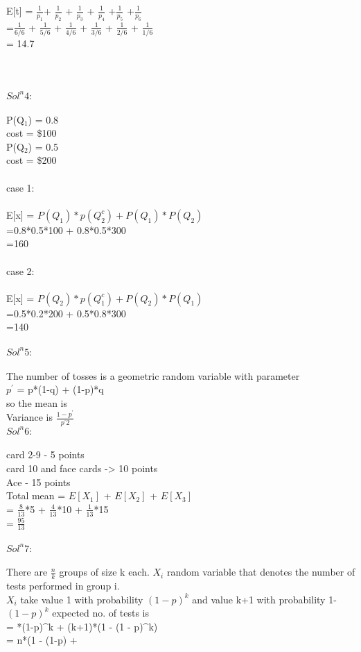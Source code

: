\documentclass{article}
\begin{document}
E[t] = $\frac{1}{p_1}$+ $\frac{1}{p_2}$ + $\frac{1}{p_3}$ + $\frac{1}{p_4}$ +$\frac{1}{p_5}$ +$\frac{1}{p_6}$  \\
        =$\frac{1}{6/6}$ + $\frac{1}{5/6}$ + $\frac{1}{4/6}$ + $\frac{1}{3/6}$ + $\frac{1}{2/6}$ + $\frac{1}{1/6}$ \\
= 14.7\\\\\\\\
\textbf{$Sol^n 4:$} \\\\
P(Q$_1$) = 0.8 \\
cost = \$100 \\
P(Q$_2$) = 0.5 \\
cost = \$200 \\\\
case 1:\\\\
E[x] = $P(Q_1)*p(Q_2^c) + P(Q_1)*P(Q_2)$\\
=0.8*0.5*100 + 0.8*0.5*300\\
=160\\\\
case 2:\\\\
E[x] = $P(Q_2)*p(Q_1^c) + P(Q_2)*P(Q_1)$\\
=0.5*0.2*200 + 0.5*0.8*300\\
=140\\\\
\textbf{$Sol^n 5:$} \\\\
The number of tosses is a geometric random variable with parameter \\
$p^{'}$ = p*(1-q) + (1-p)*q \\
so the mean is \\
Variance is $\frac{1-p^'}{p^'2}$\\
\textbf{$Sol^n 6:$} \\\\
card 2-9 - 5 points \\
card 10 and face cards -> 10 points\\
Ace - 15 points\\
Total mean = $E[X_1]$ + $E[X_2]$ + $E[X_3]$\\
           = $\frac{8}{13}$*5 + $\frac{4}{13}$*10 + $\frac{1}{13}$*15 \\
           = $\frac{95}{13}$\\\\
\textbf{$Sol^n 7:$} \\\\
There are $\frac{n}{k}$ groups of size k each. $X_i$ random variable that denotes the number of tests performed in group i. \\
$X_{i}$ take value 1 with probability $(1-p)^{k}$ and value k+1 with probability 1-$(1-p)^{k}$ expected no. of tests is\\
= *(1-p)^{k} + (k+1)*(1 - (1 - p)^{k})\\
= n*(1 - (1-p) + 
\end{document}
